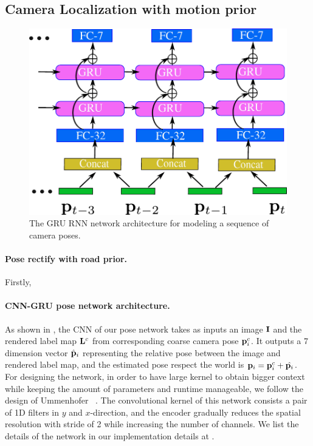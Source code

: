 \subsection{Camera Localization with motion prior}

\begin{figure}[t]
\begin{center}
\includegraphics[width=\linewidth]{fig/RNN.pdf}
\end{center}
   \caption{The GRU RNN network architecture for modeling a sequence of camera poses.}
\label{fig:rnn}
\end{figure}

\paragraph{Pose rectify with road prior.} Firstly,

\paragraph{CNN-GRU pose network architecture.}
As shown in , the CNN of our pose network takes as inputs an image ${\mathbf I}$ and the rendered label map ${\mathbf L}^c$ from corresponding coarse camera pose ${\mathbf p}_i^c$. It outputs a 7 dimension vector $\hat{{\mathbf p}}_i$ representing the relative pose between the image and rendered label map, and the estimated pose respect the world is ${\mathbf p}_i = {\mathbf p}_i^c + \hat{{\mathbf p}_i}$.
For designing the network, in order to have large kernel to obtain bigger context while keeping the amount of parameters and runtime manageable, we follow the design of Ummenhofer \etal~\cite{ummenhofer2016demon}. The convolutional kernel of this network consists a pair of 1D filters in $y$ and $x$-direction, and the encoder gradually reduces the spatial resolution with stride of 2 while increasing the number of channels. We list the details of the network in our implementation details at .

